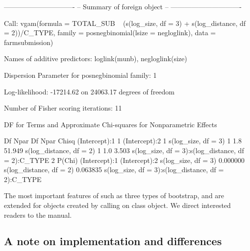 \documentclass[nojss]{jss}
\newcommand{\1}{\mathcal{I}} \newcommand{\bZero}{\boldsymbol{0}}
\begin{document}
\begin{CodeChunk}
\begin{CodeOutput}
-------------------------------
-- Summary of foreign object --
-------------------------------

Call:
vgam(formula = TOTAL_SUB ~ (s(log_size, df = 3) + s(log_distance,
    df = 2))/C_TYPE, family = posnegbinomial(lsize = negloglink),
    data = farmsubmission)

Names of additive predictors: loglink(munb), negloglink(size)

Dispersion Parameter for posnegbinomial family:   1

Log-likelihood: -17214.62 on 24063.17 degrees of freedom

Number of Fisher scoring iterations:  11

DF for Terms and Approximate Chi-squares for Nonparametric Effects

                                                   Df Npar Df Npar Chisq
(Intercept):1                                       1
(Intercept):2                                       1
s(log_size, df = 3)                                 1     1.8     51.949
s(log_distance, df = 2)                             1     1.0      3.503
s(log_size, df = 3):s(log_distance, df = 2):C_TYPE  2
                                                     P(Chi)
(Intercept):1
(Intercept):2
s(log_size, df = 3)                                0.000000
s(log_distance, df = 2)                            0.063835
s(log_size, df = 3):s(log_distance, df = 2):C_TYPE
\end{CodeOutput}
\end{CodeChunk}

\normalsize

The most important features of  such as three types
of bootstrap,  and  are extended
for objects created by calling  on
 class object. We direct interested readers
to the manual.

\subsection{A note on implementation and
differences}\label{a-note-on-implementation-and-differences}
\end{document}
